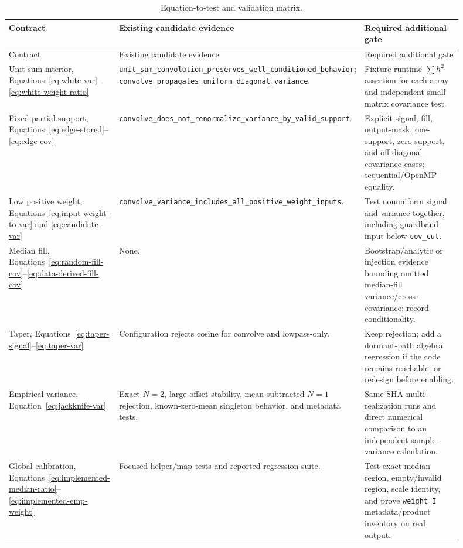 \documentclass[11pt]{article}
\newcommand{\code}[1]{\nolinkurl{#1}}
\begin{document}
\small
\begin{longtable}{L{0.25\linewidth}L{0.31\linewidth}L{0.34\linewidth}}
\caption{Equation-to-test and validation matrix.}\label{tab:tests}\\
\toprule
Contract & Existing candidate evidence & Required additional gate\\
\midrule
\endfirsthead
\toprule
Contract & Existing candidate evidence & Required additional gate\\
\midrule
\endhead
Unit-sum interior, Equations~\eqref{eq:white-var}--\eqref{eq:white-weight-ratio} & \code{unit_sum_convolution_preserves_well_conditioned_behavior}; \code{convolve_propagates_uniform_diagonal_variance}. & Fixture-runtime $\sum h^2$ assertion for each array and independent small-matrix covariance test.\\
Fixed partial support, Equations~\eqref{eq:edge-stored}--\eqref{eq:edge-cov} & \code{convolve_does_not_renormalize_variance_by_valid_support}. & Explicit signal, fill, output-mask, one-support, zero-support, and off-diagonal covariance cases; sequential/OpenMP equality.\\
Low positive weight, Equations~\eqref{eq:input-weight-to-var} and \eqref{eq:candidate-var} & \code{convolve_variance_includes_all_positive_weight_inputs}. & Test nonuniform signal and variance together, including guardband input below \code{cov_cut}.\\
Median fill, Equations~\eqref{eq:random-fill-cov}--\eqref{eq:data-derived-fill-cov} & None. & Bootstrap/analytic or injection evidence bounding omitted median-fill variance/cross-covariance; record conditionality.\\
Taper, Equations~\eqref{eq:taper-signal}--\eqref{eq:taper-var} & Configuration rejects cosine for convolve and lowpass-only. & Keep rejection; add a dormant-path algebra regression if the code remains reachable, or redesign before enabling.\\
Empirical variance, Equation~\eqref{eq:jackknife-var} & Exact $N=2$, large-offset stability, mean-subtracted $N=1$ rejection, known-zero-mean singleton behavior, and metadata tests. & Same-SHA multi-realization runs and direct numerical comparison to an independent sample-variance calculation.\\
Global calibration, Equations~\eqref{eq:implemented-median-ratio}--\eqref{eq:implemented-emp-weight} & Focused helper/map tests and reported regression suite. & Test exact median region, empty/invalid region, scale identity, and prove \code{weight_I} metadata/product inventory on real output.\\

\end{longtable}
\end{document}

